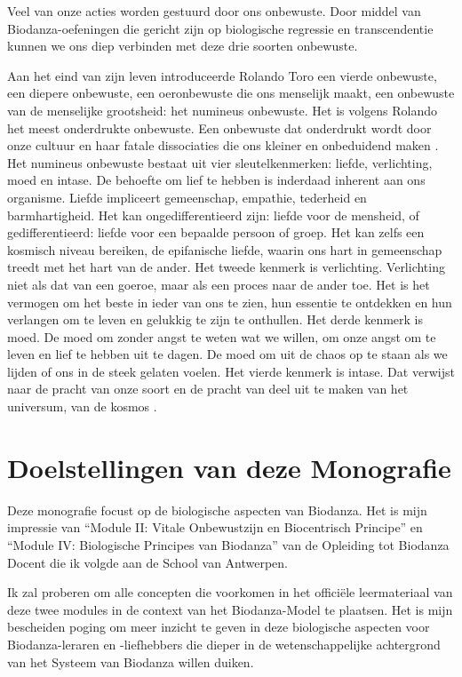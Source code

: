\documentclass[
  11pt,
]{book}
\begin{document}
Veel van onze acties worden gestuurd door ons onbewuste. Door middel van Biodanza-oefeningen die gericht zijn op biologische regressie en transcendentie kunnen we ons diep verbinden met deze drie soorten onbewuste.

Aan het eind van zijn leven introduceerde Rolando Toro een vierde onbewuste, een diepere onbewuste, een oeronbewuste die ons menselijk maakt, een onbewuste van de menselijke grootsheid: het numineus onbewuste. Het is volgens Rolando het meest onderdrukte onbewuste. Een onbewuste dat onderdrukt wordt door onze cultuur en haar fatale dissociaties die ons kleiner en onbeduidend maken \citep{toro2009}.
Het numineus onbewuste bestaat uit vier sleutelkenmerken: liefde, verlichting, moed en intase. De behoefte om lief te hebben is inderdaad inherent aan ons organisme. Liefde impliceert gemeenschap, empathie, tederheid en barmhartigheid. Het kan ongedifferentieerd zijn: liefde voor de mensheid, of gedifferentieerd: liefde voor een bepaalde persoon of groep. Het kan zelfs een kosmisch niveau bereiken, de epifanische liefde, waarin ons hart in gemeenschap treedt met het hart van de ander. Het tweede kenmerk is verlichting. Verlichting niet als dat van een goeroe, maar als een proces naar de ander toe. Het is het vermogen om het beste in ieder van ons te zien, hun essentie te ontdekken en hun verlangen om te leven en gelukkig te zijn te onthullen. Het derde kenmerk is moed. De moed om zonder angst te weten wat we willen, om onze angst om te leven en lief te hebben uit te dagen. De moed om uit de chaos op te staan als we lijden of ons in de steek gelaten voelen. Het vierde kenmerk is intase. Dat verwijst naar de pracht van onze soort en de pracht van deel uit te maken van het universum, van de kosmos \citep{toro2009}.
\newpage 

\hypertarget{doelstellingen-van-deze-monografie}{%
\section{Doelstellingen van deze Monografie}\label{doelstellingen-van-deze-monografie}}

Deze monografie focust op de biologische aspecten van Biodanza. Het is mijn impressie van ``Module II: Vitale Onbewustzijn en Biocentrisch Principe'' en ``Module IV: Biologische Principes van Biodanza'' van de Opleiding tot Biodanza Docent die ik volgde aan de School van Antwerpen.

Ik zal proberen om alle concepten die voorkomen in het officiële leermateriaal van deze twee modules in de context van het Biodanza-Model te plaatsen. Het is mijn bescheiden poging om meer inzicht te geven in deze biologische aspecten voor Biodanza-leraren en -liefhebbers die dieper in de wetenschappelijke achtergrond van het Systeem van Biodanza willen duiken.
\end{document}
